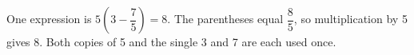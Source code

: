 One expression is $\boxed{5\left(3-\dfrac{7}{5}\right)=8}$. The parentheses equal $\dfrac{8}{5}$, so multiplication by 5 gives 8. Both copies of 5 and the single 3 and 7 are each used once.
